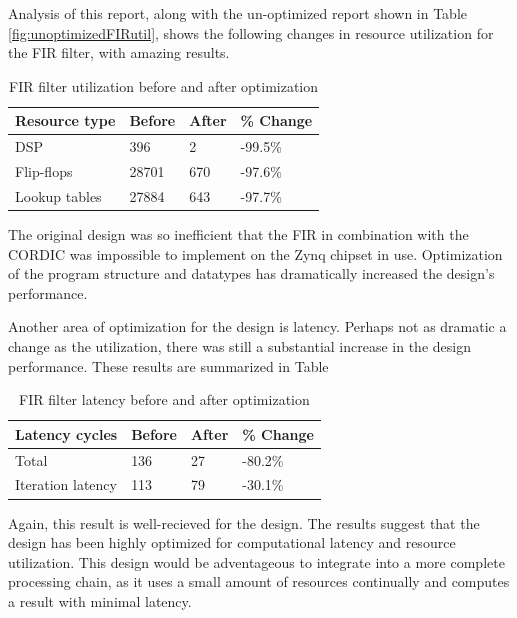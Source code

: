 \documentclass[../report_polarFIR.tex]{subfiles}
\begin{document}
 Analysis of this report, along with the un-optimized report shown in Table \ref{fig:unoptimizedFIRutil}, shows the following changes in resource utilization for the FIR filter, with amazing results.
 
 
\begin{table}[h!]
    \centering
    
    \begin{tabular}{|l|l|l|l|}
        \hline
		\textbf{Resource type} & \textbf{Before} & \textbf{After} & \textbf{\% Change} \\
		\hline \hline
		DSP & 396 & 2 & -99.5\% \\
		\hline
		Flip-flops & 28701 & 670 & -97.6\% \\
		\hline
		Lookup tables & 27884 & 643 & -97.7\% \\
	\hline
		
    \end{tabular}
    \label{FIRresourceComparison}
    \caption{FIR filter utilization before and after optimization}
\end{table}
\FloatBarrier

The original design was so inefficient that the FIR in combination with the CORDIC was impossible to implement on the Zynq chipset in use. Optimization of the program structure and datatypes has dramatically increased the design's performance.

Another area of optimization for the design is latency. Perhaps not as dramatic a change as the utilization, there was still a substantial increase in the design performance. These results are summarized in Table 
 
 \begin{table}[h!]
    \centering
    
    \begin{tabular}{|l|l|l|l|}
        \hline
		\textbf{Latency cycles} & \textbf{Before} & \textbf{After} & \textbf{\% Change} \\
		\hline \hline
		Total & 136 & 27 & -80.2\% \\
		\hline
		Iteration latency & 113 & 79 & -30.1\% \\
	\hline
		
    \end{tabular}
    \label{FIRresourceComparison}
    \caption{FIR filter latency before and after optimization}
\end{table}
\FloatBarrier

Again, this result is well-recieved for the design. The results suggest that the design has been highly optimized for computational latency and resource utilization. This design would be adventageous to integrate into a more complete processing chain, as it uses a small amount of resources continually and computes a result with minimal latency.
\end{document}
